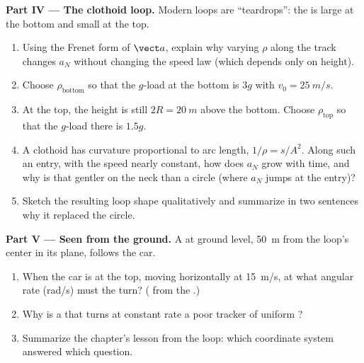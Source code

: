 \begin{problem}
\medskip
\noindent\textbf{Part IV --- The clothoid loop.}
Modern loops are ``teardrops'': the  is large at the
bottom and small at the top.
\begin{enumerate}[resume]
  \item Using the Frenet form of $\vect a$, explain why varying $\rho$
        along the track changes $a_N$ without changing the speed law
        (which depends only on height).
  \item Choose $\rho_{\text{bottom}}$ so that the $g$-load at the
        bottom is $3g$ with $v_0 = \qty{25}{m/s}$.
  \item At the top, the height is still $2R = \qty{20}{m}$ above the
        bottom. Choose $\rho_{\text{top}}$ so that the $g$-load there is
        $1.5g$.
  \item A clothoid has curvature proportional to arc length,
        $1/\rho = s/A^2$. Along such an entry, with the speed nearly
        constant, how does $a_N$ grow with time, and why is that gentler
        on the neck than a circle (where $a_N$ jumps at the entry)?
  \item Sketch the resulting loop shape qualitatively and summarize in
        two sentences why it replaced the circle.
\end{enumerate}

\medskip
\noindent\textbf{Part V --- Seen from the ground.}
A  at ground level, \qty{50}{m} from the loop's center in its
plane, follows the car.
\begin{enumerate}[resume]
  \item When the car is at the top, moving horizontally at
        \qty{15}{m/s}, at what angular rate (rad/s) must the  turn?
        ( from the .)
  \item Why is a  that turns at constant rate a poor tracker of
        uniform ?
  \item Summarize the chapter's lesson from the loop: which coordinate
        system answered which question.
\end{enumerate}
\end{problem}
